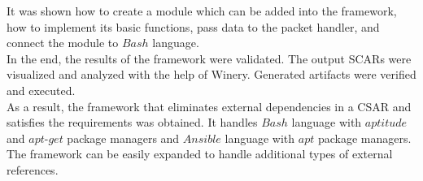 It  was shown how to create a module which can be added into the framework, how to implement its basic functions, pass data to the packet handler, and connect the module to $Bash$ language. \\
In the end, the results of the framework were validated.
The output SCARs were visualized and analyzed with the help of Winery.
Generated artifacts were verified and executed.\\
As a result, the framework that eliminates external dependencies in a CSAR and satisfies the requirements was obtained.
It handles $Bash$ language with $aptitude$ and $apt$-$get$ package managers and $Ansible$ language with $apt$ package managers.
The framework can be easily expanded to handle additional types of external references. 

